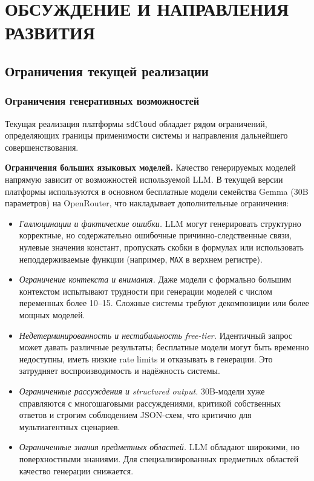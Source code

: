 
\chapter{ОБСУЖДЕНИЕ И НАПРАВЛЕНИЯ РАЗВИТИЯ}

\section{Ограничения текущей реализации}

\subsection{Ограничения генеративных возможностей}

Текущая реализация платформы \texttt{sdCloud} обладает рядом ограничений, определяющих границы применимости системы и направления дальнейшего совершенствования.

\textbf{Ограничения больших языковых моделей.} Качество генерируемых моделей напрямую зависит от возможностей используемой LLM. В текущей версии платформы используются в основном бесплатные модели семейства Gemma (30B параметров) на OpenRouter, что накладывает дополнительные ограничения:

\begin{itemize}
    \item \emph{Галлюцинации и фактические ошибки.} LLM могут генерировать структурно корректные, но содержательно ошибочные причинно-следственные связи, нулевые значения констант, пропускать скобки в формулах или использовать неподдерживаемые функции (например, \texttt{MAX} в верхнем регистре).

    \item \emph{Ограничение контекста и внимания.} Даже модели с формально большим контекстом испытывают трудности при генерации моделей с числом переменных более 10--15. Сложные системы требуют декомпозиции или более мощных моделей.

    \item \emph{Недетерминированность и нестабильность free-tier.} Идентичный запрос может давать различные результаты; бесплатные модели могут быть временно недоступны, иметь низкие rate limits и отказывать в генерации. Это затрудняет воспроизводимость и надёжность системы.

    \item \emph{Ограниченные рассуждения и structured output.} 30B-модели хуже справляются с многошаговыми рассуждениями, критикой собственных ответов и строгим соблюдением JSON-схем, что критично для мультиагентных сценариев.

    \item \emph{Ограниченные знания предметных областей.} LLM обладают широкими, но поверхностными знаниями. Для специализированных предметных областей качество генерации снижается.
\end{itemize}

